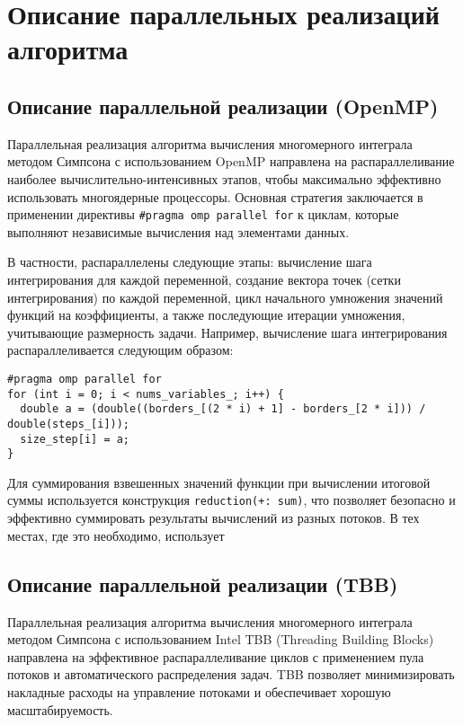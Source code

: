 \documentclass[12pt]{article}
\begin{document}
\section{Описание параллельных реализаций алгоритма}

\subsection{Описание параллельной реализации (OpenMP)}

\hspace*{1.35em}Параллельная реализация алгоритма вычисления многомерного интеграла методом Симпсона с использованием OpenMP направлена на распараллеливание наиболее вычислительно-интенсивных этапов, чтобы максимально эффективно использовать многоядерные процессоры. Основная стратегия заключается в применении директивы \texttt{\#pragma omp parallel for} к циклам, которые выполняют независимые вычисления над элементами данных.

В частности, распараллелены следующие этапы: вычисление шага интегрирования для каждой переменной, создание вектора точек (сетки интегрирования) по каждой переменной, цикл начального умножения значений функций на коэффициенты, а также последующие итерации умножения, учитывающие размерность задачи.  Например, вычисление шага интегрирования распараллеливается следующим образом:

\begin{verbatim}
#pragma omp parallel for
for (int i = 0; i < nums_variables_; i++) {
  double a = (double((borders_[(2 * i) + 1] - borders_[2 * i])) / double(steps_[i]));
  size_step[i] = a;
}
\end{verbatim}

Для суммирования взвешенных значений функции при вычислении итоговой суммы используется конструкция \texttt{reduction(+: sum)}, что позволяет безопасно и эффективно суммировать результаты вычислений из разных потоков. В тех местах, где это необходимо, использует


\subsection{Описание параллельной реализации (TBB)}

\hspace*{1.35em}Параллельная реализация алгоритма вычисления многомерного интеграла методом Симпсона с использованием Intel TBB (Threading Building Blocks) направлена на эффективное распараллеливание циклов с применением пула потоков и автоматического распределения задач. TBB позволяет минимизировать накладные расходы на управление потоками и обеспечивает хорошую масштабируемость.
\end{document}
